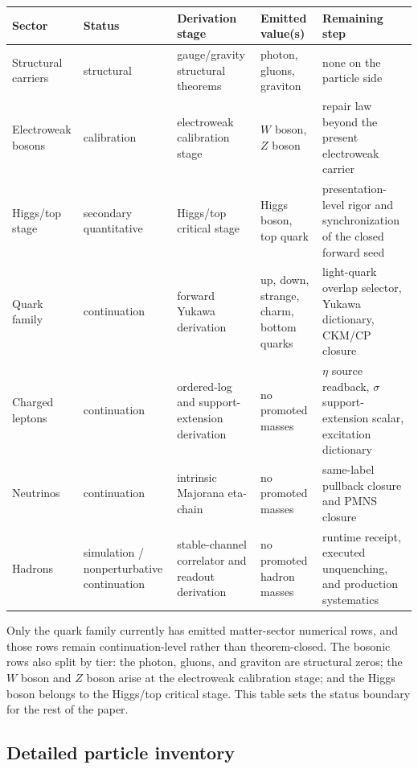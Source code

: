 \documentclass[11pt]{article}
\begin{document}
\begin{table}[h]
\centering
\small
\begin{tabular}{@{}>{\raggedright\arraybackslash}p{}>{\raggedright\arraybackslash}p{}>{\raggedright\arraybackslash}p{}>{\raggedright\arraybackslash}p{}>{\raggedright\arraybackslash}p{}@{}}
\toprule
Sector & Status & Derivation stage & Emitted value(s) & Remaining step \\
\midrule
Structural carriers & structural & gauge/gravity structural theorems & photon, gluons, graviton & none on the particle side \\
Electroweak bosons & calibration & electroweak calibration stage & \(W\) boson, \(Z\) boson & repair law beyond the present electroweak carrier \\
Higgs/top stage & secondary quantitative & Higgs/top critical stage & Higgs boson, top quark & presentation-level rigor and synchronization of the closed forward seed \\
Quark family & continuation & forward Yukawa derivation & up, down, strange, charm, bottom quarks & light-quark overlap selector, Yukawa dictionary, CKM/CP closure \\
Charged leptons & continuation & ordered-log and support-extension derivation & no promoted masses & \(\eta\) source readback, \(\sigma\) support-extension scalar, excitation dictionary \\
Neutrinos & continuation & intrinsic Majorana eta-chain & no promoted masses & same-label pullback closure and PMNS closure \\
Hadrons & simulation / nonperturbative continuation & stable-channel correlator and readout derivation & no promoted hadron masses & runtime receipt, executed unquenching, and production systematics \\
\bottomrule
\end{tabular}
\end{table}

Only the quark family currently has emitted matter-sector numerical rows, and those rows remain
continuation-level rather than theorem-closed. The bosonic rows also split by tier: the photon,
gluons, and graviton are structural zeros; the \(W\) boson and \(Z\) boson arise at the
electroweak calibration stage; and the Higgs boson belongs to the Higgs/top critical stage. This
table sets the status boundary for the rest of the paper.

\subsection{Detailed particle inventory}
\end{document}
